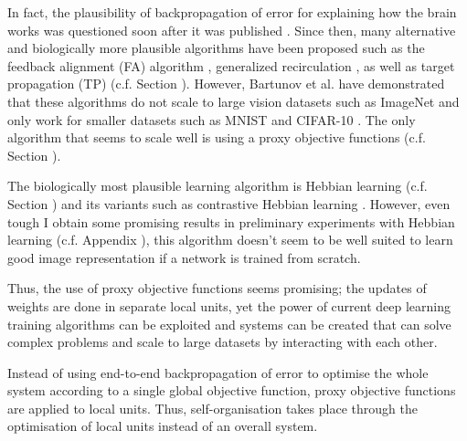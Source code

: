 In fact, the plausibility of backpropagation of error for explaining how the brain works was questioned soon after it was published .
Since then, many alternative and biologically more plausible algorithms have been proposed such as the feedback alignment (FA) algorithm , generalized recirculation , as well as target propagation (TP)  (c.f. Section ).
However, Bartunov et al.  have demonstrated that these algorithms do not scale to large vision datasets such as ImageNet \cite{deng2009imagenet} and only work for smaller datasets such as MNIST \cite{MNIST} and CIFAR-10 \cite{cifar_10}.
The only algorithm that seems to scale well is using a proxy objective functions (c.f. Section ).

The biologically most plausible learning algorithm is Hebbian learning (c.f. Section ) and its variants such as contrastive Hebbian learning .
However, even tough I obtain some promising results in preliminary experiments with Hebbian learning (c.f. Appendix ), this algorithm doesn't seem to be well suited to learn good image representation if a network is trained from scratch.

Thus, the use of proxy objective functions seems promising; the updates of weights are done in separate local units, yet the power of current deep learning training algorithms can be exploited and systems can be created that can solve complex problems and scale to large datasets by interacting with each other.

\begin{implementation}
	Instead of using end-to-end backpropagation of error to optimise the whole system according to a single global objective function, proxy objective functions are applied to local units. Thus, self-organisation takes place through the optimisation of local units instead of an overall system.
\end{implementation}


